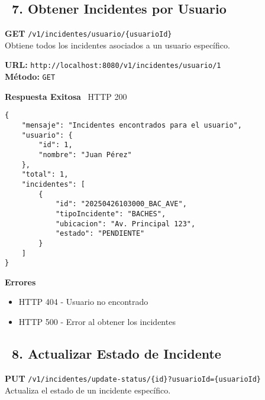 \newpage

\subsection*{\faServer\ 7. Obtener Incidentes por Usuario}
\begin{tcolorbox}[endpoint]
    \textbf{GET} \texttt{/v1/incidentes/usuario/\{usuarioId\}}\\
    Obtiene todos los incidentes asociados a un usuario específico.
\end{tcolorbox}

\begin{tcolorbox}[request]
    \textbf{URL:} \textcolor{urlColor}{\texttt{http://localhost:8080/v1/incidentes/usuario/1}}\\
    \textbf{Método:} \textcolor{methodColor}{\texttt{GET}}
\end{tcolorbox}

\begin{tcolorbox}[response]
    \textbf{Respuesta Exitosa} \faCheckCircle\ \textcolor{successColor}{HTTP 200}
    \begin{verbatim}
{
    "mensaje": "Incidentes encontrados para el usuario",
    "usuario": {
        "id": 1,
        "nombre": "Juan Pérez"
    },
    "total": 1,
    "incidentes": [
        {
            "id": "20250426103000_BAC_AVE",
            "tipoIncidente": "BACHES",
            "ubicacion": "Av. Principal 123",
            "estado": "PENDIENTE"
        }
    ]
}
    \end{verbatim}
    \textbf{Errores}
    \begin{itemize}
        \item \textcolor{errorColor}{HTTP 404} - Usuario no encontrado
        \item \textcolor{errorColor}{HTTP 500} - Error al obtener los incidentes
    \end{itemize}
\end{tcolorbox}

\newpage

\subsection*{\faServer\ 8. Actualizar Estado de Incidente}
\begin{tcolorbox}[endpoint]
    \textbf{PUT} \texttt{/v1/incidentes/update-status/\{id\}?usuarioId=\{usuarioId\}}\\
    Actualiza el estado de un incidente específico.
\end{tcolorbox}

